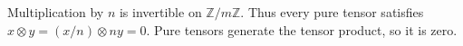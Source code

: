 Multiplication by $n$ is invertible on $\mathbb{Z}/m\mathbb{Z}$. Thus every pure tensor satisfies $x\otimes y=(x/n)\otimes ny=0$. Pure tensors generate the tensor product, so it is zero.
